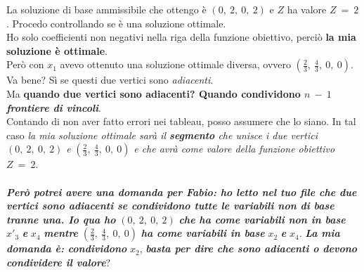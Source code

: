 \documentclass[12pt, a4paper, openany]{book}
\begin{document}
\noindent La soluzione di base ammissibile che ottengo è $(0,\ 2,\ 0,\ 2)$ e $Z$ ha valore $Z\ =\ 2$. Procedo controllando se è una soluzione ottimale.\\
\noindent Ho solo coefficienti non negativi nella riga della funzione obiettivo, perciò \textbf{la mia soluzione è ottimale}.\\
\noindent Però con $x_1$ avevo ottenuto una soluzione ottimale diversa, ovvero $(\frac{2}{3},\ \frac{4}{3},\ 0,\ 0)$. Va bene? Sì se questi due vertici sono \textit{adiacenti}.\\
\noindent Ma \textbf{quando due vertici sono adiacenti? Quando condividono $n\ -\ 1$ \textit{frontiere di vincoli}}.\\
\noindent Contando di non aver fatto errori nei tableau, posso assumere che lo siano. In tal caso \textit{la mia soluzione ottimale sarà il \textbf{segmento} che unisce i due vertici} $(0,\ 2,\ 0,\ 2)$ \textit{e} $(\frac{2}{3},\ \frac{4}{3},\ 0,\ 0)$ \textit{e che avrà come valore della funzione obiettivo} $Z\ =\ 2$.\\
\\
\noindent \textbf{\textit{Però potrei avere una domanda per Fabio: ho letto nel tuo file che due vertici sono adiacenti se condividono tutte le variabili non di base tranne una. Io qua ho}} $(0,\ 2,\ 0,\ 2)$ \textbf{\textit{che ha come variabili non in base}} $x'_3$ \textbf{\textit{e}} $x_4$ \textbf{\textit{mentre}} $(\frac{2}{3},\ \frac{4}{3},\ 0,\ 0)$ \textbf{\textit{ha come variabili in base}} $x_2$ \textbf{\textit{e}} $x_4$. \textbf{\textit{La mia domanda è: condividono}} $x_2$, \textbf{\textit{basta per dire che sono adiacenti o devono condividere il valore}}?
\end{document}
